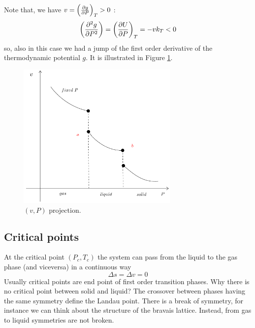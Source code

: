 \documentclass[../main/main.tex]{subfiles}
\begin{document}
\noindent
Note that, we have  \( v= \qty(\pdv{g}{P} )_T > 0  \) :
\begin{equation}
  \qty(\pdv[2]{g}{P} ) = \qty(\pdv{U}{P} )_T = -v k_T < 0
  \label{eq:}
\end{equation}
so, also in this case we had a jump of the first order derivative of the thermodynamic potential \( g \).
It is illustrated in Figure \ref{fig:2_6}.


\begin{figure}[h!]
\centering
\includegraphics[width=0.7\textwidth]{../lessons/2_image/6.pdf}
\caption{\label{fig:2_6} \( (v,P) \) projection.}
\end{figure}


\subsection{Critical points}
At the critical point \( (P_c,T_c) \) the system can pass from the liquid to the gas phase (and viceversa) in a continuous way
\begin{equation*}
  \Delta s = \Delta v = 0
\end{equation*}
Usually critical points are end point of first order transition phases. Why there is no critical point between solid and liquid? The crossover between phases having the same symmetry define the Landau point. There is a break of symmetry, for instance we can think about the structure of the bravais lattice. Instead, from gas to liquid symmetries are not broken.
\end{document}
